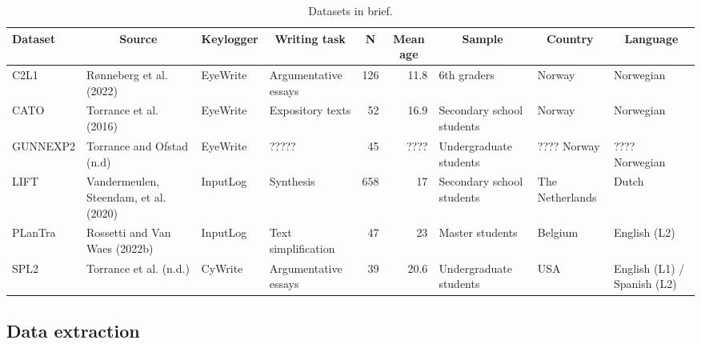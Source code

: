 \documentclass[
  man,floatsintext]{apa7}
\begin{document}
\begin{landscape}

\begin{table}[tbp]

\begin{center}
\begin{threeparttable}

\caption{\label{tab:datasets}Datasets in brief.}

\footnotesize{

\begin{tabular}{lp{3cm}p{2cm}p{2.5cm}rrp{2.5cm}p{2.25cm}p{2.5cm}}
\toprule
Dataset & \multicolumn{1}{c}{Source} & \multicolumn{1}{c}{Keylogger} & \multicolumn{1}{c}{Writing task} & \multicolumn{1}{c}{N} & \multicolumn{1}{c}{Mean age} & \multicolumn{1}{c}{Sample} & \multicolumn{1}{c}{Country} & \multicolumn{1}{c}{Language}\\
\midrule
C2L1 & Rønneberg et al. (2022) & EyeWrite & Argumentative essays & 126 & 11.8 & 6th graders & Norway & Norwegian\\
CATO & Torrance et al. (2016) & EyeWrite & Expository texts & 52 & 16.9 & Secondary school students & Norway & Norwegian\\
GUNNEXP2 & Torrance and Ofstad (n.d) & EyeWrite & ????? & 45 & ???? & Undergraduate students & ???? Norway & ???? Norwegian\\
LIFT & Vandermeulen, Steendam, et al. (2020) & InputLog & Synthesis & 658 & 17 & Secondary school students & The Netherlands & Dutch\\
PLanTra & Rossetti and Van Waes (2022b) & InputLog & Text simplification & 47 & 23 & Master students & Belgium & English (L2)\\
SPL2 & Torrance et al. (n.d.) & CyWrite & Argumentative essays & 39 & 20.6 & Undergraduate students & USA & English (L1) / Spanish (L2)\\
\bottomrule
\end{tabular}

}

\end{threeparttable}
\end{center}

\end{table}

\end{landscape}

\hypertarget{data-extraction}{%
\subsection{Data extraction}\label{data-extraction}}
\end{document}
